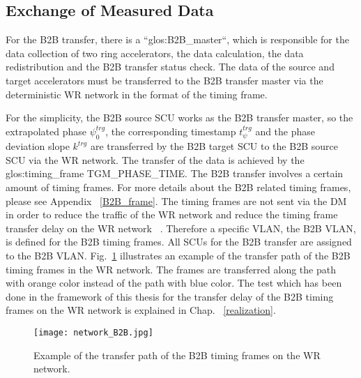 \subsection{Exchange of Measured Data}

For the B2B transfer, there is a ``\gls{glos:B2B_master}``, which is responsible for the data collection of two ring accelerators, the data calculation, the data redistribution and the B2B transfer status check. The data of the source and target accelerators must be transferred to the B2B transfer master via the deterministic WR network in the format of the timing frame.
 
For the simplicity, the B2B source SCU works as the B2B transfer master, so the extrapolated phase $\psi^\mathit{trg}_0$, the corresponding timestamp $t_\psi^\mathit{trg}$ and the phase deviation slope $k^\mathit{trg}$ are transferred by the B2B target SCU to the B2B source SCU via the WR network. The transfer of the data is achieved by the \gls{glos:timing_frame} TGM\_PHASE\_TIME. The B2B transfer involves a certain amount of timing frames. For more details about the B2B related timing frames, please see Appendix ~\ref{B2B_frame}. The timing frames are not sent via the DM in order to reduce the traffic of the WR network and reduce the timing frame transfer delay on the WR network ~\cite{bai_f-tc-c-05_2016}. Therefore a specific VLAN, the B2B \gls{VLAN}, is defined for the B2B timing frames. All SCUs for the B2B transfer are assigned to the B2B VLAN. Fig.~\ref{network_B2B} illustrates an example of the transfer path of the B2B timing frames in the WR network. The frames are transferred along the path with orange color instead of the path with blue color. The test which has been done in the framework of this thesis for the transfer delay of the B2B timing frames on the WR network is explained in Chap. ~\ref{realization}.
 \begin{figure}[!htb]
   \centering   
   \texttt{[image: network\_B2B.jpg]}
   \caption{Example of the transfer path of the B2B timing frames on the WR network.}
   \label{network_B2B}
\end{figure}
